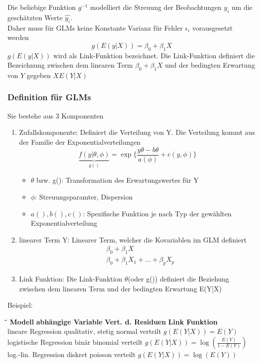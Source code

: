 Die beliebige Funktion \(g^{-1}\) modelliert die Streuung der Beobachtungen \( y_i\) um die geschätzten Werte \(\hat{y_i}\). \\
Daher muss für GLMs keine Konstante Varianz für Fehler \(\epsilon_i\) vorausgesetzt werden
\[
g(E(y|X)) = \beta_0 + \beta_1 X
\]
\(g(E(y|X))\) wird als Link-Funktion bezeichnet.
Die Link-Funktion definiert die Bezeichnung zwischen dem linearen Term \(\beta_0+ \beta_1 X\) und der bedingten Erwartung von \(Y\) gegeben \(X E(Y|X)\)

\subsubsection*{Definition für GLMs}
Sie bestehe aus 3 Komponenten 
\begin{enumerate}
	\item Zufallskomponente: Definiert die Verteilung von Y. 
	Die Verteilung kommt aus der Familie der Exponentialverteilungen	
	\[
	\underbrace{f(y | \theta, \phi)}_{g()} = \exp\{\frac{y\theta- b\theta}{a(\phi)} + c(y, \phi)\}
	\]
	\begin{itemize}
		\item [] \(\theta\) bzw. g(): Transformation des Erwartungswertes für Y
		\item [] \(\phi\): Streuungsparamter, Dispersion
		\item [] \(a(),b(), c()\): Spezifische Funktion je nach Typ der gewählten Exponentialverteilung
		
	\end{itemize}

	\item linearer Term Y:
	Linearer Term, welcher die Kovariablen im GLM definiert
	\begin{align*}
		&\beta_0 +\beta_1 X \\
		&\beta_0 + \beta_1 X_1 + \ldots + \beta_p X_p
	\end{align*}
	
	\item Link Funktion:
	Die Link-Funktion \(\theta\)(oder g()) definiert die Beziehung zwischen dem linearen Term und der bedingten Erwartung E(Y|X)
\end{enumerate}

Beispiel:
\begin{tabbing}
	\hspace{0.25\linewidth}\=\hspace{0.25\linewidth}\=\hspace{0.25\linewidth}\=\kill
	\textbf{Modell}	\>  \textbf{abhängige Variable}\>  \textbf{Vert. d. Residuen}\> \textbf{Link Funktion}\\ 
	lineare Regression\>  qualitativ, stetig\>  normal verteilt\> \(g(E(Y|X)) = E(Y)\)\\ 
	logistische Regression\>  binär\>  binomial verteilt\> \(g(E(Y|X)) = \log(\frac{E(Y)}{1-E(Y)}) \)\\ 
	log.-lin. Regression\>  diskret \>  poisson verteilt\> \(g(E(Y|X)) = \log(E(Y))\)\\
\end{tabbing} 

